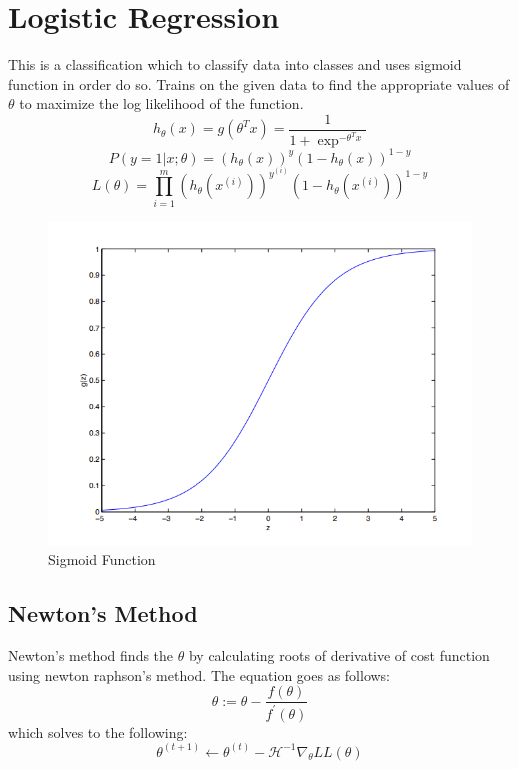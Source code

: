 \documentclass[12pt]{article}
\begin{document}
\section{Logistic Regression}
This is a classification which to classify data into classes and uses sigmoid function in order do so. Trains on the given data to find the appropriate values of $\theta$ to maximize the log likelihood of the function.
\begin{equation}
    h_{\theta}(x) = g(\theta^T x) = \frac{1}{1+\exp^{-\theta^T x}}
\end{equation}
\begin{equation}
   P(y = 1 | x; \theta) = (h_{\theta}(x))^y (1 - h_{\theta}(x))^{1-y}
\end{equation}
\begin{equation}
    L(\theta) = \prod_{i=1}^m (h_{\theta}(x^{(i)}))^y^{(i)} (1 - h_{\theta}(x^{(i)}))^{1-y}
\end{equation}
\begin{figure}[H]
  \includegraphics[width=\linewidth]{Sigmoid.PNG}
  \caption{Sigmoid Function}
  \label{fig3A}
\end{figure}
\subsection{Newton's Method}
Newton's method finds the $\theta$ by calculating roots of derivative of cost function using newton raphson's method. The equation goes as follows:
\begin{equation}
    \theta := \theta - \frac{f(\theta)}{f^{\prime}(\theta)}
\end{equation}
which solves to the following:
\begin{equation}
    \theta^{(t+1)} \leftarrow \theta^{(t)}-\mathcal{H}^{-1} \nabla_{\theta} L L(\theta)
\end{equation}
\end{document}
